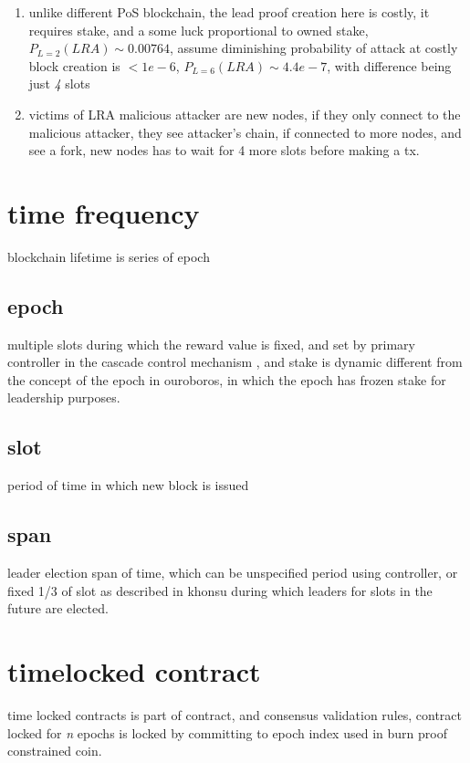 \documentclass[a4paper]{article}
\begin{document}
\begin{enumerate}
\item unlike different PoS blockchain, the lead proof creation here is costly, it requires stake, and a some luck proportional to owned stake, $P_{L=2}(LRA) \sim 0.00764$, assume diminishing probability of attack at costly block creation is $< 1e-6$, $P_{L=6}(LRA) \sim 4.4e-7$, with difference being just \emph{4} slots

\item victims of LRA malicious attacker are new nodes, if they only connect to the malicious attacker, they see attacker's chain, if connected to more nodes, and see a fork, new nodes has to wait for 4 more slots before making a tx.

\end{enumerate}


\section {time frequency}
blockchain lifetime is series of epoch


\subsection {epoch}
multiple slots during which the reward value is fixed, and set by primary controller in the cascade control mechanism \cite{cascade}, and stake is dynamic different from the concept of the epoch in ouroboros, in which the epoch has frozen stake for leadership purposes.

\subsection {slot}
period of time in which new block is issued

\subsection {span}
leader election span of time, which can be unspecified period using controller, or fixed 1/3 of slot as described in khonsu \cite{khonsu} during which leaders for slots in the future are elected.

\section {timelocked contract}
time locked contracts is part of contract, and consensus validation rules, contract locked for \emph{n} epochs is locked by committing to epoch index used in burn proof constrained coin.
\end{document}
